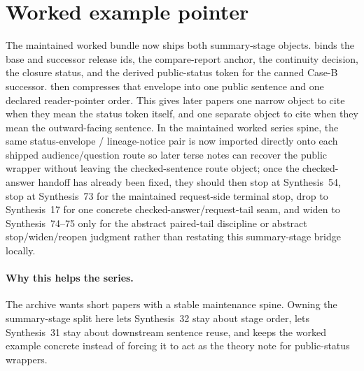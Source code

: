 \documentclass[11pt]{article}
\begin{document}
\section{Worked example pointer}
The maintained worked bundle now ships both summary-stage objects.\cite{series:workedexample}
 binds the base and successor release ids, the compare-report anchor, the continuity decision, the closure status, and the derived public-status token for the canned Case-B successor.
 then compresses that envelope into one public sentence and one declared reader-pointer order.
This gives later papers one narrow object to cite when they mean the status token itself, and one separate object to cite when they mean the outward-facing sentence. In the maintained worked series spine, the same status-envelope / lineage-notice pair is now imported directly onto each shipped audience/question route so later terse notes can recover the public wrapper without leaving the checked-sentence route object; once the checked-answer handoff has already been fixed, they should then stop at Synthesis~54, stop at Synthesis~73 for the maintained request-side terminal stop, drop to Synthesis~17 for one concrete checked-answer/request-tail seam, and widen to Synthesis~74--75 only for the abstract paired-tail discipline or abstract stop/widen/reopen judgment rather than restating this summary-stage bridge locally.\cite{series:challengeanswerreviewmenus,series:pairedterminalcitationdiscipline,series:pairedterminalcutoverrules,series:workedexample}

\paragraph{Why this helps the series.}
The archive wants short papers with a stable maintenance spine.
Owning the summary-stage split here lets Synthesis~32 stay about stage order, lets Synthesis~31 stay about downstream sentence reuse, and keeps the worked example concrete instead of forcing it to act as the theory note for public-status wrappers.
\end{document}
